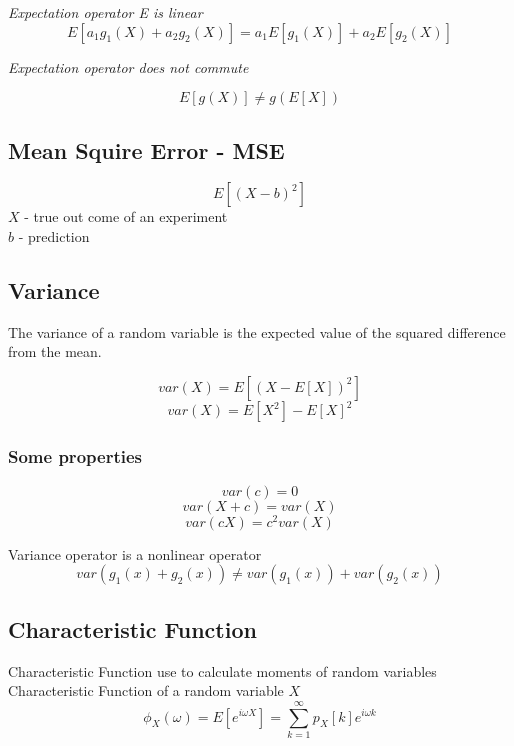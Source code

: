 {\color{red}\emph{Expectation operator E is linear}}
\begin{equation*}
	E[a_{1}g_{1}(X)+a_{2}g_{2}(X)]=a_{1}E[g_{1}(X)]+a_{2}E[g_{2}(X)]
\end{equation*}

\emph{{\color{red}Expectation operator does not commute}}

\begin{equation*}
	E[g(X)]\neq g(E[X])
\end{equation*}

\subsection{Mean Squire Error - MSE}
\begin{equation*}
	E[(X-b)^{2}]
\end{equation*}
$X$ - true out come of an experiment\\ 
$b$ - prediction 


\subsection{Variance}
The variance of a random variable is the expected value of the squared difference from the mean.

\begin{equation*}
	var(X)=E[(X-E[X])^{2}]
\end{equation*}
\begin{equation*}
	var(X)=E[X^{2}]-E[X]^{2}
\end{equation*}

\subsubsection{Some properties}
\begin{equation*}
	var(c)=0
\end{equation*}
\begin{equation*}
	var(X+c)=var(X)
	\end{equation*}
\begin{equation*}
	var(cX)=c^{2}var(X)
\end{equation*}

{\color{red} Variance operator is a nonlinear operator}
\begin{equation*}
	var(g_{1}(x)+g_{2}(x))\neq var(g_{1}(x))+var(g_{2}(x))
\end{equation*}


\subsection{Characteristic Function}
 Characteristic Function use to calculate moments of random variables\\ 
 Characteristic Function of a random variable $X$
\begin{equation*}
	\phi_{X}(\omega)=E[e^{i\omega X}]=\sum_{k=1}^{\infty}p_{X}[k]e^{i\omega k}
\end{equation*}


